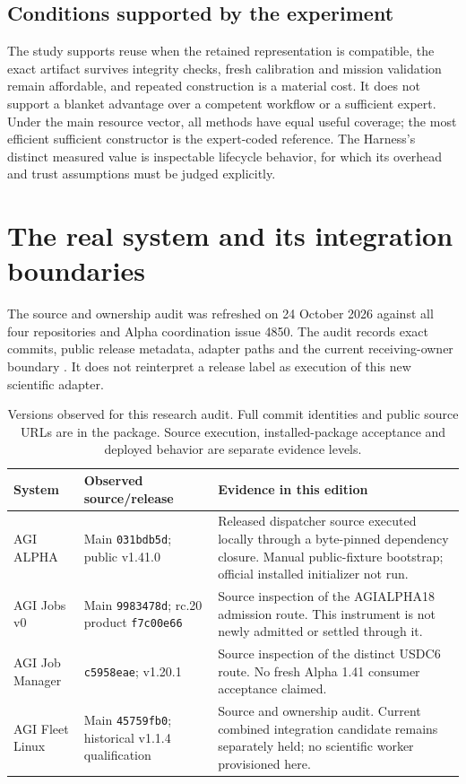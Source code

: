 \documentclass[11pt]{article}
\newcommand{\code}[1]{\texttt{#1}}
\begin{document}


\subsection{Conditions supported by the experiment}

The study supports reuse when the retained representation is compatible, the exact artifact survives integrity checks, fresh calibration and mission validation remain affordable, and repeated construction is a material cost. It does not support a blanket advantage over a competent workflow or a sufficient expert. Under the main resource vector, all methods have equal useful coverage; the most efficient sufficient constructor is the expert-coded reference. The Harness's distinct measured value is inspectable lifecycle behavior, for which its overhead and trust assumptions must be judged explicitly.



\section{The real system and its integration boundaries}
\label{sec:system}

The source and ownership audit was refreshed on 24 October 2026 against all four repositories and Alpha coordination issue 4850. The audit records exact commits, public release metadata, adapter paths and the current receiving-owner boundary \cite{alpha_source,jobs_source,manager_source,fleet_source,coordination}. It does not reinterpret a release label as execution of this new scientific adapter.

\begin{table}[htbp]
\centering\small
\begin{tabularx}{\linewidth}{P{.18\linewidth}P{.22\linewidth}Y}
\toprule
\textbf{System} & \textbf{Observed source/release} & \textbf{Evidence in this edition}\\
\midrule
AGI ALPHA & Main \code{031bdb5d}; public v1.41.0 & Released dispatcher source executed locally through a byte-pinned dependency closure. Manual public-fixture bootstrap; official installed initializer not run.\\
AGI Jobs v0 & Main \code{9983478d}; rc.20 product \code{f7c00e66} & Source inspection of the AGIALPHA18 admission route. This instrument is not newly admitted or settled through it.\\
AGI Job Manager & \code{c5958eae}; v1.20.1 & Source inspection of the distinct USDC6 route. No fresh Alpha 1.41 consumer acceptance claimed.\\
AGI Fleet Linux & Main \code{45759fb0}; historical v1.1.4 qualification & Source and ownership audit. Current combined integration candidate remains separately held; no scientific worker provisioned here.\\
\bottomrule
\end{tabularx}
\caption{Versions observed for this research audit. Full commit identities and public source URLs are in the package. Source execution, installed-package acceptance and deployed behavior are separate evidence levels.}
\label{tab:systems}
\end{table}
\end{document}
